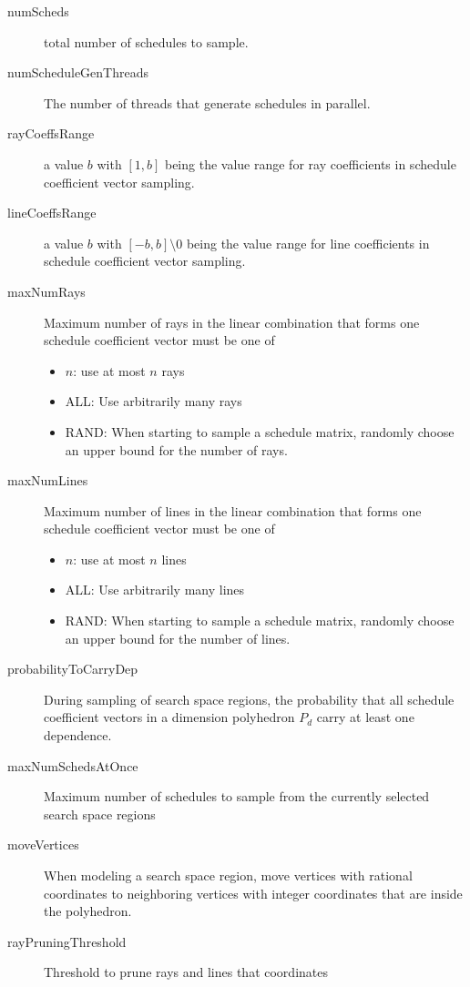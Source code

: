 \documentclass{article}
\begin{document}
\begin{description}
    \item[numScheds] total number of schedules to sample.
    \item[numScheduleGenThreads] The number of threads that generate schedules in parallel.
    \item[rayCoeffsRange] a value $b$ with $[1, b]$ being the value range for ray coefficients
        in schedule coefficient vector sampling.
    \item[lineCoeffsRange] a value $b$ with $[-b, b] \setminus {0}$ being the value range for line coefficients
        in schedule coefficient vector sampling.
    \item[maxNumRays] Maximum number of rays in the linear combination that forms one schedule coefficient vector
      must be one of
      \begin{itemize}
      \item $n$: use at most $n$ rays
      \item ALL: Use arbitrarily many rays
      \item RAND: When starting to sample a schedule matrix, randomly choose an
        upper bound for the number of rays.
      \end{itemize}
    \item[maxNumLines] Maximum number of lines in the linear combination that forms one schedule coefficient vector
      must be one of
      \begin{itemize}
      \item $n$: use at most $n$ lines
      \item ALL: Use arbitrarily many lines
      \item RAND: When starting to sample a schedule matrix, randomly choose an
        upper bound for the number of lines.
      \end{itemize}
    \item[probabilityToCarryDep] During sampling of search space regions, the probability
      that all schedule coefficient vectors in a dimension polyhedron $P_d$ carry at
      least one dependence.
    \item[maxNumSchedsAtOnce] Maximum number of schedules to sample from the currently
    selected search space regions
    \item[moveVertices] When modeling a search space region, move vertices with
    rational coordinates to neighboring vertices with integer coordinates that
    are inside the polyhedron.
    \item[rayPruningThreshold] Threshold to prune rays and lines that coordinates

\end{description}
\end{document}

